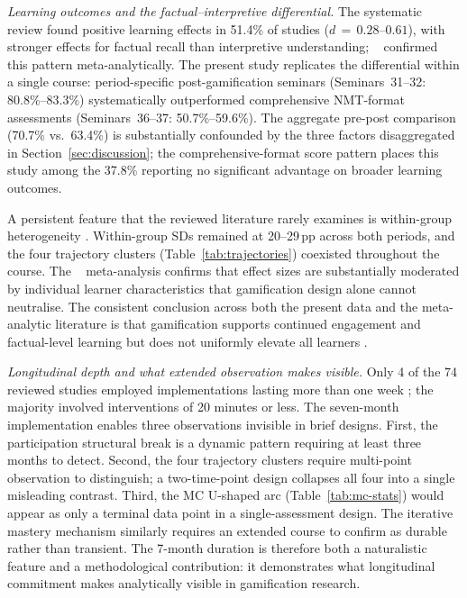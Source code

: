 \textit{Learning outcomes and the factual--interpretive differential.} The systematic review \cite{KorniienkoSemerikov2024} found positive learning effects in 51.4\% of studies ($d\,{=}\,0.28$--$0.61$), with stronger effects for factual recall than interpretive understanding; \citeauthor{BaiHewHuang2020}~\cite{BaiHewHuang2020} confirmed this pattern meta-analytically. The present study replicates the differential within a single course: period-specific post-gamification seminars (Seminars~31--32: 80.8\%--83.3\%) systematically outperformed comprehensive NMT-format assessments (Seminars~36--37: 50.7\%--59.6\%). The aggregate pre-post comparison (70.7\% vs.\ 63.4\%) is substantially confounded by the three factors disaggregated in Section~\ref{sec:discussion}; the comprehensive-format score pattern places this study among the 37.8\% reporting no significant advantage on broader learning outcomes.

A persistent feature that the reviewed literature rarely examines is within-group heterogeneity \cite{KorniienkoSemerikov2024}. Within-group SDs remained at 20--29\,pp across both periods, and the four trajectory clusters (Table~\ref{tab:trajectories}) coexisted throughout the course. The \citeauthor{SailerHomner2020}~\cite{SailerHomner2020} meta-analysis confirms that effect sizes are substantially moderated by individual learner characteristics that gamification design alone cannot neutralise. The consistent conclusion across both the present data and the meta-analytic literature is that gamification supports continued engagement and factual-level learning but does not uniformly elevate all learners \cite{Clark2016, Connolly2012}.

\textit{Longitudinal depth and what extended observation makes visible.} Only 4 of the 74 reviewed studies employed implementations lasting more than one week \cite{KorniienkoSemerikov2024}; the majority involved interventions of 20 minutes or less. The seven-month implementation enables three observations invisible in brief designs. First, the participation structural break is a dynamic pattern requiring at least three months to detect. Second, the four trajectory clusters require multi-point observation to distinguish; a two-time-point design collapses all four into a single misleading contrast. Third, the MC U-shaped arc (Table~\ref{tab:mc-stats}) would appear as only a terminal data point in a single-assessment design. The iterative mastery mechanism similarly requires an extended course to confirm as durable rather than transient. The 7-month duration is therefore both a naturalistic feature and a methodological contribution: it demonstrates what longitudinal commitment makes analytically visible in gamification research.

